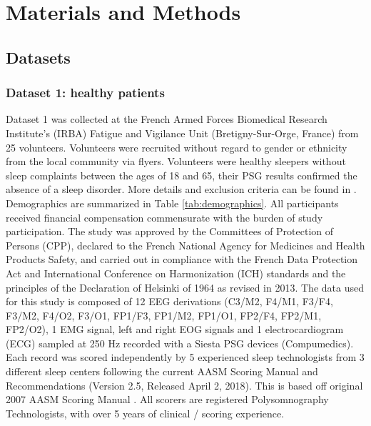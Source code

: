 \documentclass[journal]{IEEEtran}
\begin{document}
\section{Materials and Methods}

\subsection{Datasets}

\subsubsection{Dataset 1: healthy patients}
Dataset 1 was collected at the French Armed Forces Biomedical Research Institute's (IRBA) Fatigue and Vigilance Unit (Bretigny-Sur-Orge, France) from 25 volunteers. Volunteers were recruited without regard to gender or ethnicity from the local community via flyers. Volunteers were healthy sleepers without sleep complaints between the ages of 18 and 65, their PSG results confirmed the absence of a sleep disorder. More details and exclusion criteria can be found in \cite{Arnal662734}. Demographics are summarized in Table \ref{tab:demographics}. All participants received financial compensation commensurate with the burden of study participation. The study was approved by the Committees of Protection of Persons (CPP), declared to the French National Agency for Medicines and Health Products Safety, and carried out in compliance with the French Data Protection Act and International Conference on Harmonization (ICH) standards and the principles of the Declaration of Helsinki of 1964 as revised in 2013.
The data used for this study is composed of 12 EEG derivations (C3/M2, F4/M1, F3/F4, F3/M2, F4/O2, F3/O1, FP1/F3, FP1/M2, FP1/O1, FP2/F4, FP2/M1, FP2/O2), 1 EMG signal, left and right EOG signals and 1 electrocardiogram (ECG) sampled at 250 Hz recorded with a Siesta PSG devices (Compumedics).
Each record was scored independently by 5 experienced sleep technologists from 3 different sleep centers following the current AASM Scoring Manual and Recommendations (Version 2.5, Released April 2, 2018). This is based off original 2007 AASM Scoring Manual \cite{Iber2007TheSpecifications}. All scorers are registered Polysomnography Technologists, with over 5 years of clinical / scoring experience.
\end{document}
